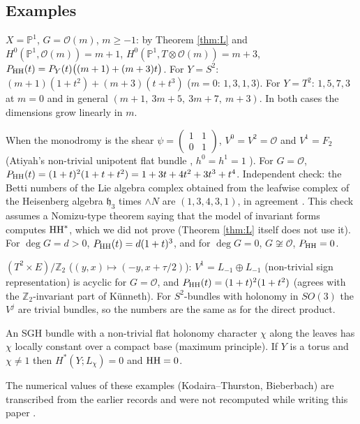 \subsection{Examples}
\begin{ex}\tP \tV\label{ex:prodY}
$X=\mathbb P^1$, $G=\mathcal O(m)$, $m\ge-1$: by Theorem \ref{thm:L} and $H^0(\mathbb P^1,\mathcal O(m))=m+1$, $H^0(\mathbb P^1,T\otimes\mathcal O(m))=m+3$, $P_{\mathrm{HH}}(t)=P_Y(t)\bigl((m+1)+(m+3)t\bigr)$. For $Y=S^2$: $(m+1)(1+t^2)+(m+3)(t+t^3)$ ($m=0$: $1,3,1,3$). For $Y=T^2$: $1,5,7,3$ at $m=0$ and in general $(m+1,\ 3m+5,\ 3m+7,\ m+3)$. In both cases the dimensions grow linearly in $m$.
\end{ex}
\begin{ex}\tP \tV \tQ
When the monodromy is the shear $\psi=\begin{pmatrix}1&1\\0&1\end{pmatrix}$, $V^0=V^2=\mathcal O$ and $V^1=F_2$ (Atiyah's non-trivial unipotent flat bundle \cite{Atiyah}, $h^0=h^1=1$ \tC). For $G=\mathcal O$, $P_{\mathrm{HH}}(t)=(1+t)^2(1+t+t^2)=1+3t+4t^2+3t^3+t^4$. Independent check: the Betti numbers of the Lie algebra complex obtained from the leafwise complex of the Heisenberg algebra $\mathfrak h_3$ times $\wedge N$ are $(1,3,4,3,1)$, in agreement \tV. This check assumes a Nomizu-type theorem saying that the model of invariant forms computes $\mathrm{HH}^*$, which we did not prove \tQ (Theorem \ref{thm:L} itself does not use it). For $\deg G=d>0$, $P_{\mathrm{HH}}(t)=d(1+t)^3$, and for $\deg G=0$, $G\not\cong\mathcal O$, $P_{\mathrm{HH}}=0$.
\end{ex}
\begin{ex}\tP \tV
$(T^2\times E)/\mathbb Z_2$ ($(y,x)\mapsto(-y,x+\tau/2)$): $V^1=L_{-1}\oplus L_{-1}$ (non-trivial sign representation) is acyclic for $G=\mathcal O$, and $P_{\mathrm{HH}}(t)=(1+t)^2(1+t^2)$ (agrees with the $\mathbb Z_2$-invariant part of K\"unneth). For $S^2$-bundles with holonomy in $SO(3)$ the $V^j$ are trivial bundles, so the numbers are the same as for the direct product.
\end{ex}
\begin{rem}\tP
An SGH bundle with a non-trivial flat holonomy character $\chi$ along the leaves has $\chi$ locally constant over a compact base (maximum principle). If $Y$ is a torus and $\chi\ne1$ then $H^*(Y;L_\chi)=0$ and $\mathrm{HH}=0$.
\end{rem}
\tC The numerical values of these examples (Kodaira--Thurston, Bieberbach) are transcribed from the earlier records and were not recomputed while writing this paper \tQ.

